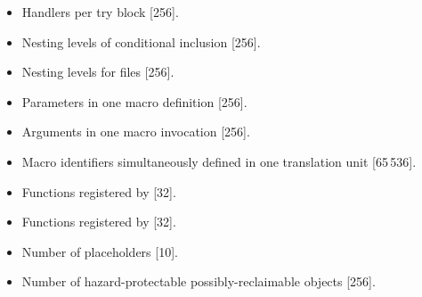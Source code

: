 \begin{itemize}
\item%
Handlers per try block [256].

\item%
Nesting levels of conditional inclusion [256].
\item%
Nesting levels for
files [256].
\item%
Parameters in one macro definition [256].
\item%
Arguments in one macro invocation [256].
\item%
Macro identifiers simultaneously defined in one
translation
unit [65\,536].

\item%
Functions registered by
 [32].
\item%
Functions registered by
 [32].
\item%
Number of placeholders [10].
\item%
Number of hazard-protectable possibly-reclaimable objects [256].

\end{itemize}
